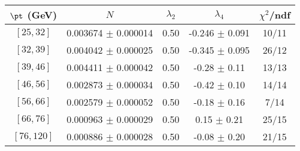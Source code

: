 \begin{tabular}{c||c|c|c|c}
$\pt$ (GeV) & $N$ & $\lambda_{2}$ & $\lambda_4$  & $\chi^2$/ndf  \\
\hline
$[25, 32]$ & 0.003674 $\pm$ 0.000014 & 0.50 & -0.246 $\pm$ 0.091 & 10/11\\
$[32, 39]$ & 0.004042 $\pm$ 0.000025 & 0.50 & -0.345 $\pm$ 0.095 & 26/12\\
$[39, 46]$ & 0.004411 $\pm$ 0.000042 & 0.50 & -0.28 $\pm$ 0.11 & 13/13\\
$[46, 56]$ & 0.002873 $\pm$ 0.000034 & 0.50 & -0.42 $\pm$ 0.10 & 14/14\\
$[56, 66]$ & 0.002579 $\pm$ 0.000052 & 0.50 & -0.18 $\pm$ 0.16 & 7/14\\
$[66, 76]$ & 0.000963 $\pm$ 0.000029 & 0.50 & 0.15 $\pm$ 0.21 & 25/15\\
$[76, 120]$ & 0.000886 $\pm$ 0.000028 & 0.50 & -0.08 $\pm$ 0.20 & 21/15\\
\end{tabular}
